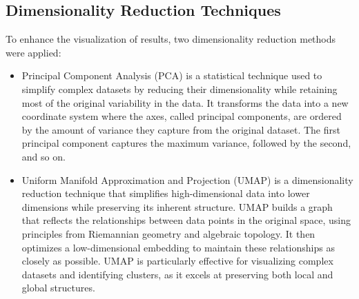 \subsection{Dimensionality Reduction Techniques}
To enhance the visualization of results, two dimensionality reduction methods were applied: 
\begin{itemize}
    \item Principal Component Analysis (PCA) is a statistical technique used to simplify complex datasets by reducing
    their dimensionality while retaining most of the original variability in the data. It transforms the data into a new coordinate
     system where the axes, called principal components, are ordered by the amount of variance they capture from the original dataset. 
     The first principal component captures the maximum variance, followed by the second, and so on.
     \item Uniform Manifold Approximation and Projection (UMAP) is a dimensionality reduction technique 
     that simplifies high-dimensional data into lower dimensions while preserving its inherent structure. UMAP builds a graph 
     that reflects the relationships between data points in the original space, using principles from Riemannian geometry and 
     algebraic topology. It then optimizes a low-dimensional embedding to maintain these relationships as closely as possible. 
     UMAP is particularly effective for visualizing complex datasets and identifying clusters, as it excels at preserving both 
     local and global structures.
\end{itemize}
